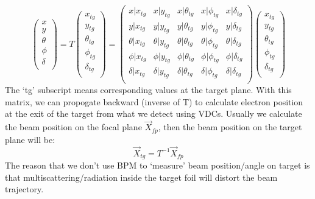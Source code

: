 \begin{equation}
    \begin{pmatrix}
	x   \\
	y   \\
	\theta	\\
	\phi	\\
	\delta	\\
    \end{pmatrix}
    =
    T
    \begin{pmatrix}
	x_{tg}   \\
	y_{tg}   \\
	\theta_{tg}	\\
	\phi_{tg}	\\
	\delta_{tg}	\\
    \end{pmatrix}
    =
    \begin{pmatrix}
	x|x_{tg} & x|y_{tg}   & x|\theta_{tg}	& x|\phi_{tg}    & x|\delta_{tg}    \\
	y|x_{tg} & y|y_{tg}   & y|\theta_{tg}	& y|\phi_{tg}    & y|\delta_{tg}    \\
	\theta|x_{tg} & \theta|y_{tg}   & \theta|\theta_{tg}	& \theta|\phi_{tg}    & \theta|\delta_{tg}    \\
	\phi|x_{tg} & \phi|y_{tg}   & \phi|\theta_{tg}	& \phi|\phi_{tg}    & \phi|\delta_{tg}    \\
	\delta|x_{tg} & \delta|y_{tg}   & \delta|\theta_{tg}	& \delta|\phi_{tg}    & \delta|\delta_{tg}    \\
    \end{pmatrix}
    \begin{pmatrix}
	x_{tg}   \\
	y_{tg}   \\
	\theta_{tg}	\\
	\phi_{tg}	\\
	\delta_{tg}	\\
    \end{pmatrix}
\end{equation}
The `tg' subscript means corresponding values at the target plane. With this matrix, we can
propogate backward (inverse of T) to calculate electron position at the exit 
of the target from what we detect using VDCs. Usually we calculate the beam
position on the focal plane $\vec{X}_{fp}$, then the beam position on the target
plane will be: 
\begin{equation}
    \vec{X}_{tg} = T^{-1} \vec{X}_{fp}
    \label{eq:reconstruction}
\end{equation}
The reason that we don't use BPM to `measure' beam position/angle on target is that 
multiscattering/radiation inside the target foil will distort the beam trajectory. 

